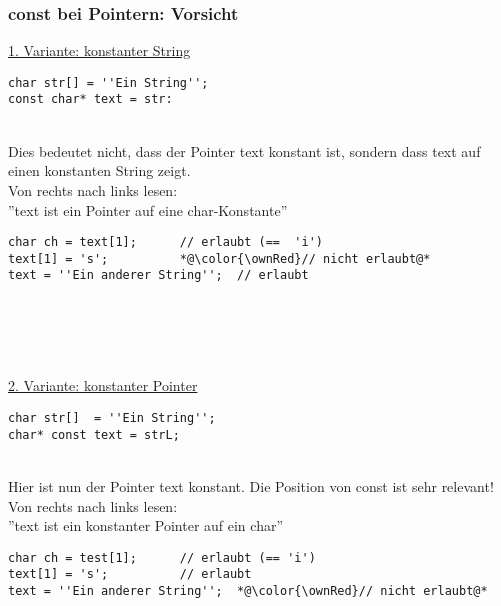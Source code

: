 \subsubsection{const bei Pointern: Vorsicht\hfill}
\label{sec:const bei Pointern: Vorsicht}
\underline{1. Variante: konstanter String}\\
\noindent
\begin{minipage}{\linewidth}
\begin{lstlisting}
char str[] = ''Ein String'';
const char* text = str:
\end{lstlisting}
\end{minipage}
\\
Dies bedeutet nicht, dass der Pointer text konstant ist, sondern dass text auf einen konstanten String zeigt.\\
Von rechts nach links lesen:\\ ''text ist ein Pointer auf eine char-Konstante''\\
\noindent
\begin{minipage}{\linewidth}
\begin{lstlisting}
char ch = text[1];		// erlaubt (==  'i')
text[1] = 's';			*@\color{\ownRed}// nicht erlaubt@*
text = ''Ein anderer String'';	// erlaubt
\end{lstlisting}
\end{minipage}
\\ \\ \\ \\
\underline{2. Variante: konstanter Pointer}\\
\noindent
\begin{minipage}{\linewidth}
\begin{lstlisting}
char str[]  = ''Ein String'';
char* const text = strL;
\end{lstlisting}
\end{minipage}
\\
Hier ist nun der Pointer text konstant. Die Position von const ist sehr relevant!\\
Von rechts nach links lesen:\\ ''text ist ein konstanter Pointer auf ein char''\\
\noindent
\begin{minipage}{\linewidth}
\begin{lstlisting}
char ch = test[1];		// erlaubt (== 'i')
text[1] = 's';			// erlaubt
text = ''Ein anderer String'';	*@\color{\ownRed}// nicht erlaubt@*
\end{lstlisting}
\end{minipage}
